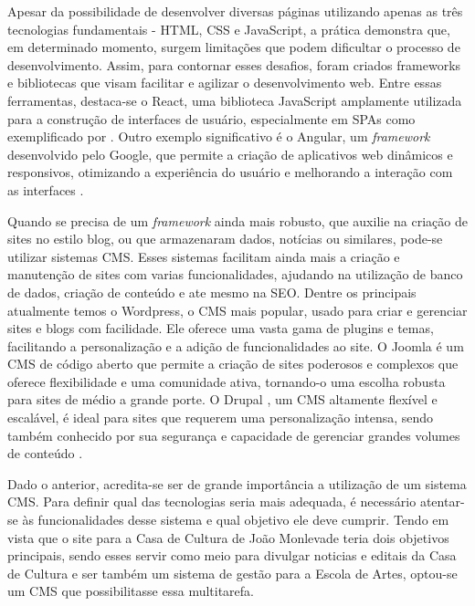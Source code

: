 Apesar da possibilidade de desenvolver diversas páginas utilizando apenas as três tecnologias fundamentais - \ac{HTML}, \ac{CSS} e JavaScript, a prática demonstra que, em determinado momento, surgem limitações que podem dificultar o processo de desenvolvimento. Assim, para contornar esses desafios, foram criados frameworks e bibliotecas que visam facilitar e agilizar o desenvolvimento web. Entre essas ferramentas, destaca-se o React, uma biblioteca JavaScript amplamente utilizada para a construção de interfaces de usuário, especialmente em \ac{SPAs} como exemplificado por . Outro exemplo significativo é o Angular, um \textit{framework} desenvolvido pelo Google, que permite a criação de aplicativos web dinâmicos e responsivos, otimizando a experiência do usuário e melhorando a interação com as interfaces \cite{green2013angularjs}.

Quando se precisa de um \textit{framework} ainda mais robusto, que auxilie na criação de sites no estilo blog, ou que armazenaram dados, notícias ou similares, pode-se utilizar sistemas \ac{CMS}. Esses sistemas facilitam ainda mais a criação e manutenção de sites com varias funcionalidades, ajudando na utilização de banco de dados, criação de conteúdo e ate mesmo na \ac{SEO}. Dentre os principais atualmente temos o Wordpress, o \ac{CMS} mais popular, usado para criar e gerenciar sites e blogs com facilidade. Ele oferece uma vasta gama de plugins e temas, facilitando a personalização e a adição de funcionalidades ao site. O Joomla \cite{Joomla} é um \ac{CMS} de código aberto que permite a criação de sites poderosos e complexos que oferece flexibilidade e uma comunidade ativa, tornando-o uma escolha robusta para sites de médio a grande porte. O Drupal \cite{Drupal}, um \ac{CMS} altamente flexível e escalável, é ideal para sites que requerem uma personalização intensa, sendo também conhecido por sua segurança e capacidade de gerenciar grandes volumes de conteúdo \cite{canavan2011cms}.

Dado o anterior, acredita-se ser de grande importância a utilização de um sistema \ac{CMS}. Para definir qual das tecnologias seria mais adequada, é necessário atentar-se às funcionalidades desse sistema e qual objetivo ele deve cumprir. Tendo em vista que o site para a Casa de Cultura de João Monlevade teria dois objetivos principais, sendo esses servir como meio para divulgar noticias e editais da Casa de Cultura e ser também um sistema de gestão para a Escola de Artes, optou-se um \ac{CMS} que possibilitasse essa multitarefa.

